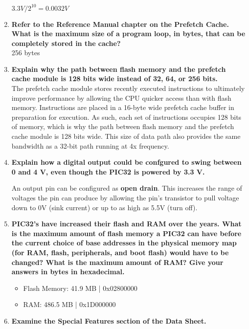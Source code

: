 \documentclass{article}
\begin{document}
\begin{enumerate}[label=\textbf{\arabic*})]
    $3.3 V/2^{10} = 0.0032 V$

    \item \textbf{Refer to the Reference Manual chapter on the Prefetch Cache. What is the maximum
    size of a program loop, in bytes, that can be completely stored in the cache?} \\

    256 bytes

    \item \textbf{Explain why the path between flash memory and the prefetch cache module is 128 bits
    wide instead of 32, 64, or 256 bits.} \\

    The prefetch cache module stores recently executed instructions to ultimately improve performance
    by allowing the CPU quicker access than with flash memory. Instructions are placed in a 16-byte 
    wide prefetch cache buffer in preparation for execution. As such, each set of instructions occupies 
    128 bits of memory, which is why the path between flash memory and the prefetch cache module is 
    128 bits wide. This size of data path also provides the same bandwidth as a 32-bit path running 
    at 4x frequency.

    \item \textbf{Explain how a digital output could be confgured to swing between 0 and 4 V, even
    though the PIC32 is powered by 3.3 V.}

    An output pin can be configured as \textbf{open drain}. This increases the range of voltages
    the pin can produce by allowing the pin's transistor to pull voltage down to 0V (sink current) 
    or up to as high as 5.5V (turn off).  

    \item \textbf{PIC32’s have increased their flash and RAM over the years. What is the maximum
    amount of flash memory a PIC32 can have before the current choice of base addresses in
    the physical memory map (for RAM, flash, peripherals, and boot flash) would have to be
    changed? What is the maximum amount of RAM? Give your answers in bytes in
    hexadecimal.}

    \begin{itemize}
        \item Flash Memory: 41.9 MB | 0x02800000
        \item RAM: 486.5 MB | 0x1D000000
    \end{itemize}

    \item \textbf{Examine the Special Features section of the Data Sheet.} \\
    

\end{enumerate}
\end{document}
